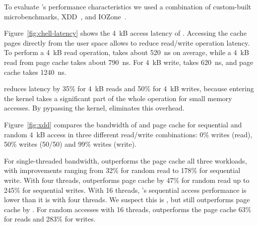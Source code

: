 
To evaluate \CChell{}'s performance characteristics we used a combination of
custom-built microbenchmarks, XDD~\cite{xdd}, and IOZone~\cite{iozone}.

Figure~\ref{fig:chell-latency} shows the 4~kB access latency of \CChell{}.
Accessing the cache pages
directly from the user space allows \CChell{} to reduce read/write operation
latency.  To perform a 4~kB read operation, \CChell{} takes
about 520~ns on average, while a 4~kB read from page cache takes about 790~ns.
For 4~kB write, \CChell{} takes 620~ns, and page cache takes 1240~ns.

\CChell{} reduces latency by 35\% for 4~kB reads and 50\% for 4~kB writes, because entering the kernel
takes a significant part
of the whole operation for small memory accesses. By pypassing the kernel,
\CChell{} eliminates this overhead. 

Figure~\ref{fig:xdd} compares the bandwidth of \CChell{} and page cache for sequential and
random 4~kB access in three different read/write combinations: 0\% writes
(read), 50\% writes (50/50) and 99\% writes (write).

For single-threaded bandwidth, \CChell{} outperforms the page cache 
all three workloads, with improvements ranging from 32\% for random read to
178\% for sequential write.  With four threads,
\CChell{} outperforms page cache by 47\% for random read up to 245\% for sequential writes.
With 16 threads, \CChell{}'s sequential access performance is lower than it is with
four threads.  We suspect this is , but \CChell{} still outperforms page
cache by .  For random accesses with 16 threads, \CChell{}
outperforms the page cache 63\% for reads and 283\% for
writes.



